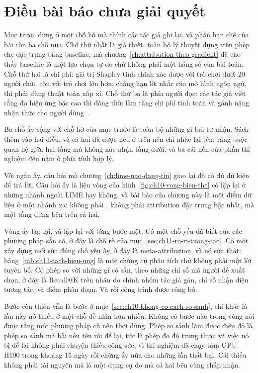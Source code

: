 \section{Điều bài báo chưa giải quyết}
\label{sec:ch11-dieu-chua-giai-quyet}

Mục trước dừng ở một chỗ hở mà chính các tác giả ghi lại, và phần hạn chế của
bài còn ba chỗ nữa. Chỗ thứ nhất là giả thiết: toàn bộ lý thuyết dựng trên phép
che đặc trưng bằng baseline, mà chương~\ref{ch:attribution-theo-gradient} đã
cho thấy baseline là một lựa chọn tự do chứ không phải một hằng số của bài
toán. Chỗ thứ hai là chi phí: giá trị Shapley tính chính xác được với trò chơi dưới
20 người chơi, còn với trò chơi lớn hơn, chẳng hạn lời nhắc của mô hình ngôn
ngữ, thì phải dùng thuật toán xấp xỉ.
Chỗ thứ ba là phía người đọc: các tác giả viết rằng đo hiệu ứng bậc cao thì
đồng thời làm tăng chi phí tính toán và gánh nặng nhận thức cho người
dùng~\autocite{p23metagame}.

Ba chỗ ấy cộng với chỗ hở của mục trước là toàn bộ những gì bài tự nhận. Sách
thêm vào hai điều, và cả hai đã được nêu ở trên nên chỉ nhắc lại tên:
 ràng buộc quan hệ giữa
hai tầng mà không xác nhận tầng dưới, và
ba cái nền của phần thí nghiệm đều nằm ở phía tính hợp lý.

Với ngần ấy, câu hỏi mà chương~\ref{ch:lime-nao-dang-tin} giao lại đã có đủ dữ
kiện để trả lời. Câu hỏi ấy là liệu vòng của hình~\ref{fig:ch10-vong-bien-the}
có lặp lại ở những nhánh ngoài LIME hay không, và bài báo của chương này là một
điểm dữ liệu ở một nhánh xa: không phải , không phải
attribution đặc trưng bậc nhất, mà một tầng dựng bên trên cả hai.

Vòng ấy lặp lại, và lặp lại với từng bước một. Có một chỗ yếu đã biết của các
phương pháp sẵn có, ở đây là chỗ rò của
mục~\ref{sec:ch11-ro-ri-tuong-tac}. Có một xây dựng mới sửa đúng chỗ yếu ấy, ở
đây là meta-attribution, và nó sửa thật: bảng~\ref{tab:ch11-tach-hieu-ung} là
một chứng cứ phân tích chứ không phải một lời tuyên bố. Có phép so với những gì
có sẵn, theo những chỉ số mà người đề xuất chọn, ở đây là Recall@K trên nhãn do
chính nhóm tác giả gán, chỉ số nhận diện tương tác, và điểm phân đoạn. Và rồi
công trình được công bố.

Bước còn thiếu vẫn là bước ở mục~\ref{sec:ch10-khong-co-cach-so-sanh}, chỉ khác
là lần này nó thiếu ở một chỗ dễ nhìn hơn nhiều. Không có bước nào trong vòng
nói được rằng một phương pháp cũ nên thôi dùng. Phép so sánh làm được điều đó
là phép so sánh mà bài nêu tên rồi để lại, tức là phép đo độ trung thực; và
việc nó bị để lại không phải chuyện thiếu công sức, vì thí nghiệm đã chạy tám
GPU H100 trong khoảng 15 ngày rồi chừng ấy nữa cho những lần thất bại. Cái
thiếu không phải tài nguyên mà là một dụng cụ đo mà cả hai bên cùng chấp nhận.

